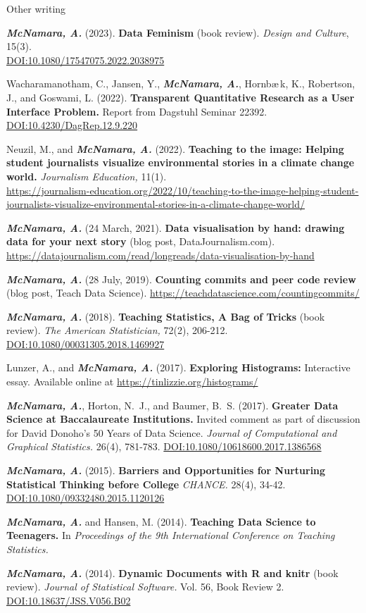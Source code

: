 \documentclass{resume} %
\begin{document}
\begin{rSection}{Other writing}

{\bf \em McNamara, A.} (2023). {\bf Data Feminism} (book review). {\em Design and Culture}, 15(3).  
\\\href{https://doi.org/10.1080/17547075.2022.2038975}{DOI:10.1080/17547075.2022.2038975}

Wacharamanotham, C., Jansen, Y., {\bf \em McNamara, A.}, Hornb\ae\,k, K., Robertson, J., and Goswami, L. (2022). {\bf Transparent Quantitative Research as a User Interface Problem.} Report from Dagstuhl Seminar 22392. \href{https://doi.org/10.4230/DagRep.12.9.220}{DOI:10.4230/DagRep.12.9.220}

Neuzil, M., and {\bf \em McNamara, A.} (2022). {\bf Teaching to the image: Helping student journalists visualize environmental stories in a climate change world.} {\em Journalism Education,} 11(1). \\ \url{https://journalism-education.org/2022/10/teaching-to-the-image-helping-student-journalists-visualize-environmental-stories-in-a-climate-change-world/}

{\bf \em McNamara, A.} (24 March, 2021). {\bf Data visualisation by hand: drawing data for your next story} (blog post, DataJournalism.com). 
\\ \url{https://datajournalism.com/read/longreads/data-visualisation-by-hand} 

{\bf \em McNamara, A.} (28 July, 2019). {\bf Counting commits and peer code review} (blog post, Teach Data Science). \url{https://teachdatascience.com/countingcommits/} 

{\bf \em McNamara, A.} (2018). {\bf Teaching Statistics, A Bag of Tricks} (book review). {\em The American Statistician,} 72(2), 206-212. \href{https://doi.org/10.1080/00031305.2018.1469927}{DOI:10.1080/00031305.2018.1469927}

Lunzer, A., and {\bf \em McNamara, A.} (2017). {\bf Exploring Histograms:} Interactive essay. Available online at \url{https://tinlizzie.org/histograms/} 

{\bf \em McNamara, A.}, Horton, N.~J., and Baumer, B.~S. (2017). {\bf Greater Data Science at Baccalaureate Institutions.} Invited comment as part of discussion for David Donoho's 50 Years of Data Science. {\em Journal of Computational and Graphical Statistics.} 26(4), 781-783. \href{https://doi.org/10.1080/10618600.2017.1386568}{DOI:10.1080/10618600.2017.1386568}

{\bf \em McNamara, A.} (2015). {\bf Barriers and Opportunities for Nurturing Statistical Thinking before College}{ \em CHANCE.} 28(4), 34-42. \href{https://doi.org/10.1080/09332480.2015.1120126}{DOI:10.1080/09332480.2015.1120126}

{\bf \em McNamara, A. }and Hansen, M. (2014). {\bf Teaching Data Science to Teenagers.} In {\em Proceedings of the 9th International Conference on Teaching Statistics.} 

{\bf \em McNamara, A. } (2014). {\bf Dynamic Documents with R and knitr} (book review). {\em Journal of Statistical Software.} Vol. 56, Book Review 2. \href{https://doi.org/10.18637/JSS.V056.B02}{DOI:10.18637/JSS.V056.B02}
\end{rSection}
\end{document}
